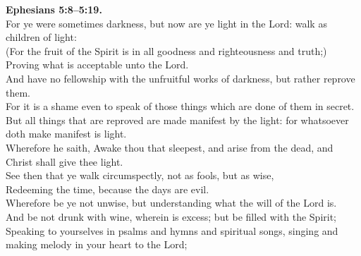 \documentclass[10pt]{article} %
\begin{document}
{\begin{minipage}[t]{0.45\textwidth}
\textbf{Ephesians 5:8--5:19.}\\
For ye were sometimes darkness, but now are ye light in the Lord: walk as children of light:\\
(For the fruit of the Spirit is in all goodness and righteousness and truth;)\\
Proving what is acceptable unto the Lord.\\
And have no fellowship with the unfruitful works of darkness, but rather reprove them.\\
For it is a shame even to speak of those things which are done of them in secret.\\
But all things that are reproved are made manifest by the light: for whatsoever doth make manifest is light.\\
Wherefore he saith, Awake thou that sleepest, and arise from the dead, and Christ shall give thee light.\\
See then that ye walk circumspectly, not as fools, but as wise,\\
Redeeming the time, because the days are evil.\\
Wherefore be ye not unwise, but understanding what the will of the Lord is.\\
And be not drunk with wine, wherein is excess; but be filled with the Spirit;\\
Speaking to yourselves in psalms and hymns and spiritual songs, singing and making melody in your heart to the Lord;\\

\end{minipage}}
\vspace*{\fill}
\newpage
\Huge%
\vspace*{\fill}
\begin{spacing}{1.3}%
\end{spacing}
\vspace*{\fill}
\end{document}
